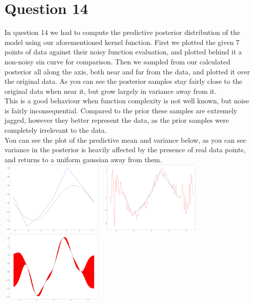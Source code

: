 \documentclass[a4paper, 9pt]{article}
\begin{document}
\section*{Question 14}
In question 14 we had to compute the predictive posterior distribution of the model using our aforementioned kernel function.
First we plotted the given 7 points of data against their noisy function evaluation, and plotted behind it a non-noisy sin curve for comparison. Then we sampled from our calculated posterior all along the axis, both near and far from the data, and plotted it over the original data. As you can see the posterior samples stay fairly close to the original data when near it, but grow largely in variance away from it. \\
This is a good behaviour when function complexity is not well known, but noise is fairly inconsequential. Compared to the prior these samples are extremely jagged, however they better represent the data, as the prior samples were completely irrelevant to the data. \\
You can see the plot of the predictive mean and variance below, as you can see variance in the posterior is heavily affected by the presence of real data points, and returns to a uniform gaussian away from them. \\
\newline
\includegraphics[width=2in,height=1.4in]{curve1}
\includegraphics[width=2in,height=1.4in]{curve2}
\includegraphics[width=2in,height=1.4in]{curve3} \\
\end{document}
